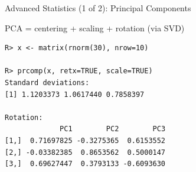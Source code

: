 \begin{frame}[fragile]
  \begin{exampleblock}{Advanced Statistics (1 of 2): Principal Components}\pause
  \begin{center}
    PCA = centering + scaling + rotation (via SVD)
  \end{center}
  \begin{lstlisting}[backgroundcolor=\color{white},basicstyle=\ttfamily\color{dkgray}\scriptsize,keywordstyle=\color{black}, 
  commentstyle=\color{orange},stringstyle=\color{mauve}]
R> x <- matrix(rnorm(30), nrow=10)

R> prcomp(x, retx=TRUE, scale=TRUE)
Standard deviations:
[1] 1.1203373 1.0617440 0.7858397

Rotation:
             PC1        PC2        PC3
[1,]  0.71697825 -0.3275365  0.6153552
[2,] -0.03382385  0.8653562  0.5000147
[3,]  0.69627447  0.3793133 -0.6093630
\end{lstlisting}
  \end{exampleblock}
\end{frame}

